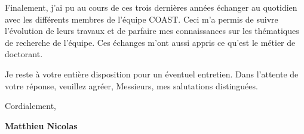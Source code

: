 \documentclass[11pt,a4paper,sans]{moderncv}        %
\newcommand{\tab}{\quad \quad}
\begin{document}

\tab Finalement, j'ai pu au cours de ces trois dernières années
échanger au quotidien avec les différents membres de l'équipe COAST.
Ceci m'a permis de suivre l'évolution de leurs travaux
et de parfaire mes connaissances sur les thématiques de recherche de l'équipe.
Ces échanges m'ont aussi appris ce qu'est le métier de doctorant.


\tab Je reste à votre entière disposition pour un éventuel entretien. Dans l'attente de votre réponse, veuillez agréer, Messieurs, mes salutations distinguées.


Cordialement,\\
\begin{flushright}
\textbf{Matthieu Nicolas}
\end{flushright}
\end{document}
